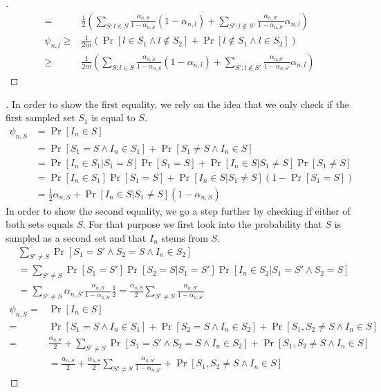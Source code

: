 \begin{proof}[]
\begin{align}
        =& \frac{1}{2}(\sum_{S: l \in S} \frac{\alpha_{n, S}}{1 - \alpha_{n,
            S}} (1 - \alpha_{n, l}) +  \sum_{S': l \notin S'} \frac{\alpha_{n,
            S'}}{1 - \alpha_{n, S'}} \alpha_{n, l}) \\
    \psi_{n, l} \geq& \frac{1}{2m} (\Pr[l \in S_1 \wedge l \notin S_2] + \Pr[l
        \notin S_1 \wedge l \in S_2]) \\
      \geq& \frac{1}{2m}(\sum_{S: l \in S} \frac{\alpha_{n, S}}{1 - \alpha_{n,
          S}} (1 - \alpha_{n, l}) +  \sum_{S': l \notin S'} \frac{\alpha_{n,
          S'}}{1 - \alpha_{n, S'}} \alpha_{n, l})
  \end{align}
\end{proof}

\begin{proof}[]
  In order to show the first equality, we rely on the idea that we only check
  if the first sampled set $S_1$ is equal to $S$.
  \begin{align}
    \psi_{n, S} &= \Pr[I_n \in S] \\
      &= \Pr[S_1 = S \wedge I_n \in S_1] + \Pr[S_1 \neq S \wedge I_n \in S] \\
      &= \Pr[I_n \in S_1 | S_1 = S] \Pr[S_1 = S] + \Pr[I_n \in S| S_1 \neq
          S]\Pr[S_1 \neq S] \\
      &= \Pr[I_n \in S_1] \Pr[S_1 = S] + \Pr[I_n \in S| S_1 \neq S](1 - \Pr[S_1
          = S]) \\
      &= \frac{1}{2} \alpha_{n, S} +  \Pr[I_n \in S | S_1 \neq S] (1 -
          \alpha_{n, S})
  \end{align}
  In order to show the second equality, we go a step further by checking if
  either of both sets equals $S$. For that purpose we first look into the
  probability that $S$ is sampled as a second set and that $I_n$ stems from $S$.
  \begin{align}
    & \sum_{S'\neq S}\Pr[S_1 = S' \wedge S_2 = S \wedge I_n \in S_2] \\
    &= \sum_{S'\neq S} \Pr[S_1 = S'] \Pr[S_2 = S | S_1 = S'] \Pr[I_n \in S_2 |
        S_1 = S' \wedge S_2 = S] \\
    &= \sum_{S'\neq S} \alpha_{n, S'} \frac{\alpha_{n, S}}{1 - \alpha_{n, S'}}
        \frac{1}{2} = \frac{\alpha_{n, S}}{2} \sum_{S'\neq S} \frac{\alpha_{n,
        S'}}{1 - \alpha_{n, S'}}
  \end{align}
  \begin{align}
    \psi_{n, S} =& \Pr[I_n \in S] \\
      =& \Pr[S_1 = S \wedge I_n \in S_1] + \Pr[S_2 = S \wedge I_n \in S_2] +
          \Pr[S_1, S_2 \neq S \wedge I_n \in S]\\
      =& \frac{\alpha_{n, S}}{2} + \sum_{S'\neq S}\Pr[S_1 = S' \wedge S_2 = S
          \wedge I_n \in S_2] +  \Pr[S_1, S_2 \neq S \wedge I_n \in S] \\
      &= \frac{\alpha_{n, S}}{2} +  \frac{\alpha_{n, S}}{2} \sum_{S'\neq S}
          \frac{\alpha_{n, S'}}{1 - \alpha_{n, S'}} + \Pr[S_1, S_2 \neq S
          \wedge I_n \in S]
    \end{align}
\end{proof}

